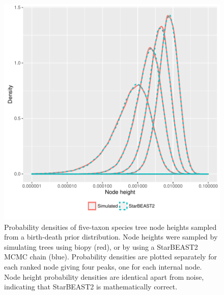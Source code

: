 \documentclass[12pt]{article}
\begin{document}
\begin{figure}[htb!]
\centering
\includegraphics[width=130mm]{species_node_heights.pdf}
\caption
{Probability densities of five-taxon species tree node heights sampled from a
birth-death prior distribution. Node heights were sampled by simulating trees
using biopy (red), or by using a StarBEAST2 MCMC chain (blue). Probability
densities are plotted separately for each ranked node giving four peaks, one
for each internal node. Node height probability densities are identical apart
from noise, indicating that StarBEAST2 is mathematically correct.}
\label{fig:speciesNodeHeights}
\end{figure}

\clearpage
\end{document}
